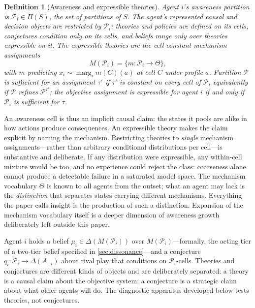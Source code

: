 \documentclass[11pt]{article}
\newtheorem{definition}[assumption]{Definition}
\theoremstyle{definition}
\newcommand{\marg}[1]{\operatorname{marg}_{#1}}
\begin{document}
\begin{definition}[Awareness and expressible theories]
\label{def:awareness}
Agent $i$'s awareness partition is $\mathcal P_i\in\Pi(S)$, the set of partitions of $S$.
The agent's represented causal and decision objects are restricted by \(\mathcal P_i\): theories and policies are defined on its cells, conjectures condition only on its cells, and beliefs range only over theories expressible on it.
The \emph{expressible theories} are the cell-constant mechanism assignments
\begin{equation}
M(\mathcal P_i)=\{m:\mathcal P_i\to\Theta\},
\label{eq:expressible}
\end{equation}
with $m$ predicting $x_i\sim\marg{i}m(C)(a)$ at cell $C$ under profile $a$.
Partition $\mathcal P$ is \emph{sufficient} for an assignment $\tau'$ if $\tau'$ is constant on every cell of $\mathcal P$, equivalently if $\mathcal P$ refines $\mathcal P^{\tau'}$; the objective assignment is expressible for agent $i$ if and only if $\mathcal P_i$ is sufficient for $\tau$.
\end{definition}

An awareness cell is thus an implicit causal claim: the states it pools are alike in how actions produce consequences.
An expressible theory makes the claim explicit by naming the mechanism.
Restricting theories to \emph{single} mechanism assignments---rather than arbitrary conditional distributions per cell---is substantive and deliberate.
If any distribution were expressible, any within-cell mixture would be too, and no experience could reject the class: coarseness alone cannot produce a detectable failure in a saturated model space.
The mechanism vocabulary $\Theta$ is known to all agents from the outset; what an agent may lack is the \emph{distinction} that separates states carrying different mechanisms.
Everything the paper calls insight is the production of such a distinction.
Expansion of the mechanism vocabulary itself is a deeper dimension of awareness growth deliberately left outside this paper.

Agent $i$ holds a belief $\mu_i\in\Delta(M(\mathcal P_i))$ over $M(\mathcal P_i)$---formally, the acting tier of a two-tier belief specified in \cref{sec:dissonance}---and a conjecture $q_i:\mathcal P_i\to\Delta(A_{-i})$ about rival play that conditions on $\mathcal P_i$-cells.
Theories and conjectures are different kinds of objects and are deliberately separated: a theory is a causal claim about the objective system; a conjecture is a strategic claim about what other agents will do.
The diagnostic apparatus developed below tests theories, not conjectures.
\end{document}
